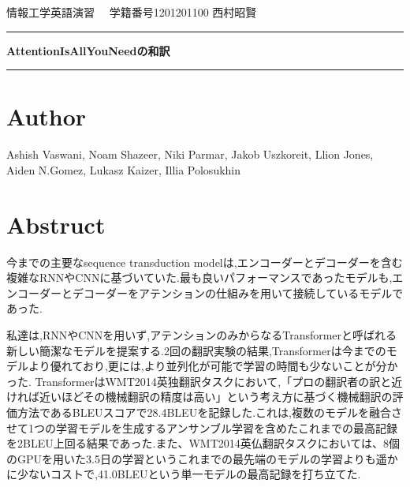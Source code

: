 \documentclass{jarticle}     %
\begin{document}
  \noindent
  \onecolumn
  \hspace{1em}

  情報工学英語演習
  \hfill
  \ \  学籍番号1201201100 西村昭賢 

  \vspace{2mm}
  \hrule
  \begin{center}
  {\Large \bf AttentionIsAllYouNeedの和訳}
  \end{center}
  \hrule
  \vspace{3mm}

\section*{Author}
Ashish Vaswani, Noam Shazeer, Niki Parmar, Jakob Uszkoreit, Llion Jones, Aiden N.Gomez, Lukasz Kaizer, Illia Polosukhin\cite{Transformer}

\section*{Abstruct}
今までの主要なsequence transduction modelは,エンコーダーとデコーダーを含む
複雑なRNNやCNNに基づいていた.最も良いパフォーマンスであったモデルも,エンコーダーとデコーダーをアテンションの仕組みを用いて接続しているモデルであった.\par
私達は,RNNやCNNを用いず,アテンションのみからなるTransformerと呼ばれる新しい簡潔なモデルを提案する.2回の翻訳実験の結果,Transformerは今までのモデルより優れており,更には,より並列化が可能で学習の時間も少ないことが分かった.
TransformerはWMT2014英独翻訳タスクにおいて,「プロの翻訳者の訳と近ければ近いほどその機械翻訳の精度は高い」という考え方に基づく機械翻訳の評価方法であるBLEUスコア\cite{BLEU}で28.4BLEUを記録した.これは,複数のモデルを融合させて1つの学習モデルを生成するアンサンブル学習\cite{ensemble}を含めたこれまでの最高記録を2BLEU上回る結果であった.また、WMT2014英仏翻訳タスクにおいては、8個のGPUを用いた3.5日の学習というこれまでの最先端のモデルの学習よりも遥かに少ないコストで,41.0BLEUという単一モデルの最高記録を打ち立てた.

\end{document}
